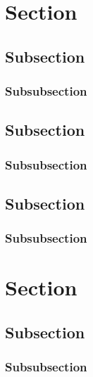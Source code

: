 \documentclass[a4paper]{article}
\begin{document}
\section{Section}
\subsection{Subsection}
\subsubsection{Subsubsection}
\subsection{Subsection}
\subsubsection{Subsubsection}
\subsection{Subsection}
\subsubsection{Subsubsection}

\section{Section}
\subsection{Subsection}
\subsubsection{Subsubsection}
\blindtext{}
\end{document}
